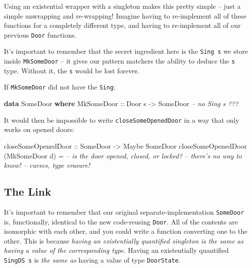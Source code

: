 \documentclass[]{article}
\newenvironment{Shaded}{}{}
\newcommand{\CommentTok}[1]{\textcolor[rgb]{0.38,0.63,0.69}{\textit{#1}}}
\newcommand{\DataTypeTok}[1]{\textcolor[rgb]{0.56,0.13,0.00}{#1}}
\newcommand{\FunctionTok}[1]{\textcolor[rgb]{0.02,0.16,0.49}{#1}}
\newcommand{\KeywordTok}[1]{\textcolor[rgb]{0.00,0.44,0.13}{\textbf{#1}}}
\newcommand{\NormalTok}[1]{#1}
\newcommand{\OtherTok}[1]{\textcolor[rgb]{0.00,0.44,0.13}{#1}}
\begin{document}
Using an existential wrapper with a singleton makes this pretty simple -- just a
simple unwrapping and re-wrapping! Imagine having to re-implement all of these
functions for a completely different type, and having to re-implement all of our
previous \texttt{Door} functions.

It's important to remember that the secret ingredient here is the
\texttt{Sing\ s} we store inside \texttt{MkSomeDoor} -- it gives our pattern
matchers the ability to deduce the \texttt{s} type. Without it, the \texttt{s}
would be lost forever.

If \texttt{MkSomeDoor} did not have the \texttt{Sing}:

\begin{Shaded}
\begin{Highlighting}[]
\KeywordTok{data} \DataTypeTok{SomeDoor} \KeywordTok{where}
    \DataTypeTok{MkSomeDoor}\OtherTok{  ::} \DataTypeTok{Door}\NormalTok{ s }\OtherTok{->} \DataTypeTok{SomeDoor}       \CommentTok{-- no Sing s ???}
\end{Highlighting}
\end{Shaded}

It would then be impossible to write \texttt{closeSomeOpenedDoor} in a way that
only works on opened doors:

\begin{Shaded}
\begin{Highlighting}[]
\OtherTok{closeSomeOpenedDoor ::} \DataTypeTok{SomeDoor} \OtherTok{->} \DataTypeTok{Maybe} \DataTypeTok{SomeDoor}
\NormalTok{closeSomeOpenedDoor (}\DataTypeTok{MkSomeDoor}\NormalTok{ d) }\FunctionTok{=}
            \CommentTok{-- is the door opened, closed, or locked?}
            \CommentTok{-- there's no way to know!}
            \CommentTok{-- curses, type erasure!}
\end{Highlighting}
\end{Shaded}

\hypertarget{the-link}{%
\subsection{The Link}\label{the-link}}

It's important to remember that our original separate-implementation
\texttt{SomeDoor} is, functionally, identical to the new code-reusing
\texttt{Door}. All of the contents are isomorphic with each other, and you could
write a function converting one to the other. This is because \emph{having an
existentially quantified singleton is the same as having a value of the
corresponding type.} Having an existentially quantified \texttt{SingDS\ s} is
\emph{the same as} having a value of type \texttt{DoorState}.
\end{document}
